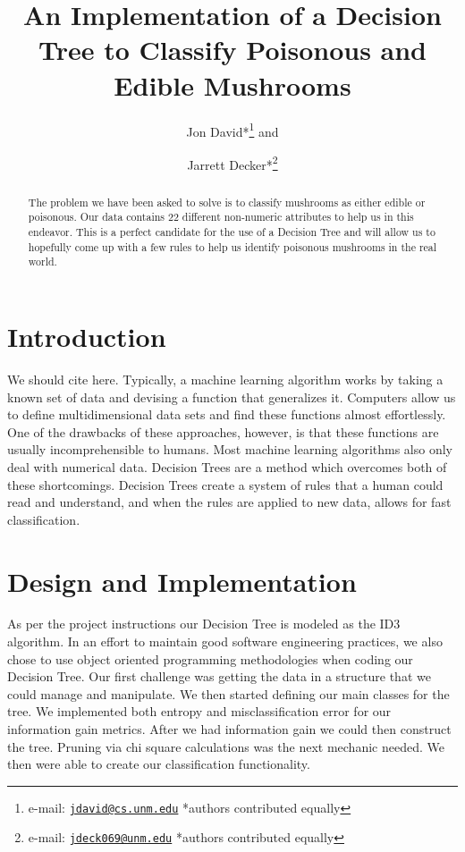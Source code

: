 \documentclass{IEEEtran}
\author{Jon David*\thanks{e-mail:
    \href{mailto:jdavid@cs.unm.edu}
         {\texttt{jdavid@cs.unm.edu}}
         {*authors contributed equally}} and
\and
       Jarrett Decker*\thanks{e-mail:
    \href{mailto:p.s.ortegel@gmail.com}
         {\texttt{jdeck069@unm.edu}}
         {*authors contributed equally}}}
\title{An Implementation of a Decision Tree to Classify Poisonous and
  Edible Mushrooms}
\begin{document}
\maketitle

\begin{abstract}

The problem we have been asked to solve is to classify mushrooms as
either edible or poisonous. Our data contains 22 different non-numeric
attributes to help us in this endeavor. This is a perfect candidate
for the use of a Decision Tree and will allow us to hopefully come up
with a few rules to help us identify poisonous mushrooms in the real
world. 
\end{abstract}

\section{Introduction}
We should cite \parencite{mitchell1997machine} here.
Typically, a machine learning algorithm works by taking a known set of
data and devising a function that generalizes it. Computers allow us
to define multidimensional data sets and find these functions almost
effortlessly. One of the drawbacks of these approaches, however, is
that these functions are usually incomprehensible to humans. Most
machine learning algorithms also only deal with numerical
data. Decision Trees are a method which overcomes both of these
shortcomings. Decision Trees create a system of rules that a human
could read and understand, and when the rules are applied to new data,
allows for fast classification.


\section{Design and Implementation}
As per the project instructions our Decision Tree is modeled as the
ID3 algorithm. In an effort to maintain good software engineering
practices, we also chose to use object oriented programming
methodologies when coding our Decision Tree. Our first challenge was
getting the data in a structure that we could manage and
manipulate. We then started defining our main classes for the tree. We
implemented both entropy and misclassification error for our
information gain metrics. After we had information gain we could then
construct the tree. Pruning via chi square calculations was the next
mechanic needed. We then were able to create our classification
functionality.
\end{document}
